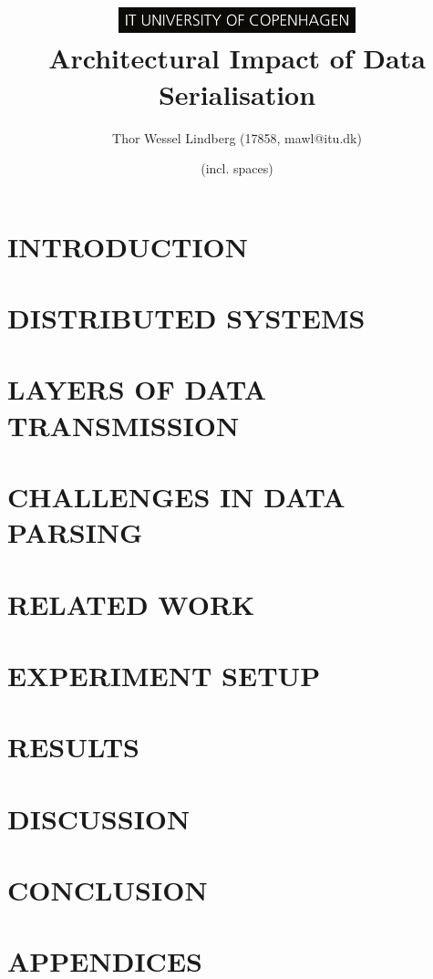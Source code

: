 \documentclass[10pt, twocolumn, letterpaper]{article}
\title{
    \includegraphics[height=0.75cm]{logo.jpg} \\
    \vspace{1.25cm}
    \LARGE \textbf{Architectural Impact of Data Serialisation} \\
}
\author{Thor Wessel Lindberg (17858, mawl@itu.dk)}
\date{\charactercount{report} (incl. spaces)}
\begin{document}
\maketitle



\section{INTRODUCTION}


\section{DISTRIBUTED SYSTEMS}


\section{LAYERS OF DATA TRANSMISSION}


\section{CHALLENGES IN DATA PARSING}


\section{RELATED WORK}


\section{EXPERIMENT SETUP}


\section{RESULTS}


\section{DISCUSSION}


\section{CONCLUSION}


\pagebreak



\onecolumn
\centering
\pagebreak

\section{APPENDICES}

\end{document}

